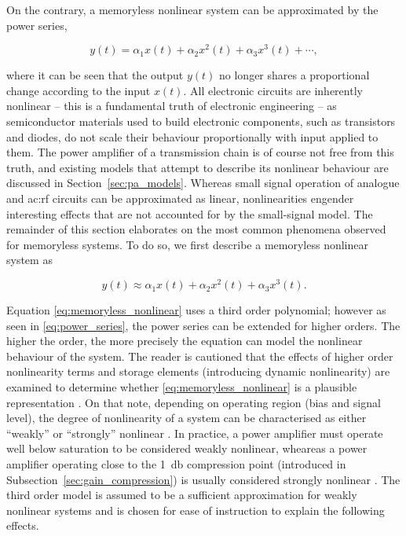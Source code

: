 On the contrary, a memoryless nonlinear system can be approximated by the power series, \cite{razavi}

\begin{equation}
  y(t) = \alpha_1 x(t) + \alpha_2 x^2(t) + \alpha_3 x^3(t) + \dotsb, 
  \label{eq:power_series}
\end{equation}

where it can be seen that the output $y(t)$ no longer shares a proportional change according to the input $x(t)$.  All electronic circuits are inherently nonlinear -- this is a fundamental truth of electronic engineering \cite{maas} -- as semiconductor materials used to build electronic components, such as transistors and diodes, do not scale their behaviour proportionally with input applied to them. The power amplifier of a transmission chain is of course not free from this truth, and existing models that attempt to describe its nonlinear behaviour are discussed in Section~\ref{sec:pa_models}. Whereas small signal operation of analogue and \gls{ac:rf} circuits can be approximated as linear, nonlinearities engender interesting effects that are not accounted for by the small-signal model. The remainder of this section elaborates on the most common phenomena observed for memoryless systems. To do so, we first describe a memoryless nonlinear system as \cite{razavi}

\begin{equation}
  y(t) \approx \alpha_1 x(t) + \alpha_2 x^2(t) + \alpha_3 x^3(t).
  \label{eq:memoryless_nonlinear}
\end{equation}

Equation \eqref{eq:memoryless_nonlinear} uses a third order polynomial; however as seen in \eqref{eq:power_series}, the power series can be extended for higher orders. The higher the order, the more precisely the equation can model the nonlinear behaviour of the system. The reader is cautioned that the effects of higher order nonlinearity terms and storage elements (introducing dynamic nonlinearity) are examined to determine whether \eqref{eq:memoryless_nonlinear} is a plausible representation \cite{razavi}. On that note, depending on operating region (bias and signal level), the degree of nonlinearity of a system can be characterised as either ``weakly'' or ``strongly'' nonlinear \cite{shi2000scs}. In practice, a power amplifier must operate well below saturation to be considered weakly nonlinear, wheareas a power amplifier operating close to the \qty{1}{\decibel} compression point (introduced in Subsection~\ref{sec:gain_compression}) is usually considered strongly nonlinear \cite{miehle}. The third order model is assumed to be a sufficient approximation for weakly nonlinear systems and is chosen for ease of instruction to explain the following effects. 

